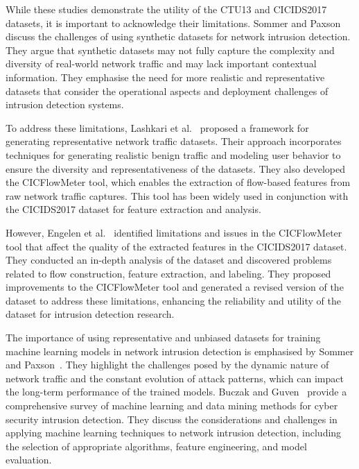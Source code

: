 While these studies demonstrate the utility of the CTU13 and CICIDS2017 datasets, it is important to acknowledge their limitations. Sommer and Paxson~\cite{sommer2010outside} discuss the challenges of using synthetic datasets for network intrusion detection. They argue that synthetic datasets may not fully capture the complexity and diversity of real-world network traffic and may lack important contextual information. They emphasise the need for more realistic and representative datasets that consider the operational aspects and deployment challenges of intrusion detection systems.

To address these limitations, Lashkari et al.~\cite{lashkari2017characterization} proposed a framework for generating representative network traffic datasets. Their approach incorporates techniques for generating realistic benign traffic and modeling user behavior to ensure the diversity and representativeness of the datasets. They also developed the CICFlowMeter tool, which enables the extraction of flow-based features from raw network traffic captures. This tool has been widely used in conjunction with the CICIDS2017 dataset for feature extraction and analysis.

However, Engelen et al.~\cite{engelen2021troubleshooting} identified limitations and issues in the CICFlowMeter tool that affect the quality of the extracted features in the CICIDS2017 dataset. They conducted an in-depth analysis of the dataset and discovered problems related to flow construction, feature extraction, and labeling. They proposed improvements to the CICFlowMeter tool and generated a revised version of the dataset to address these limitations, enhancing the reliability and utility of the dataset for intrusion detection research.

The importance of using representative and unbiased datasets for training machine learning models in network intrusion detection is emphasised by Sommer and Paxson~\cite{sommer2010outside}. They highlight the challenges posed by the dynamic nature of network traffic and the constant evolution of attack patterns, which can impact the long-term performance of the trained models. Buczak and Guven~\cite{buczak2015survey} provide a comprehensive survey of machine learning and data mining methods for cyber security intrusion detection. They discuss the considerations and challenges in applying machine learning techniques to network intrusion detection, including the selection of appropriate algorithms, feature engineering, and model evaluation.

